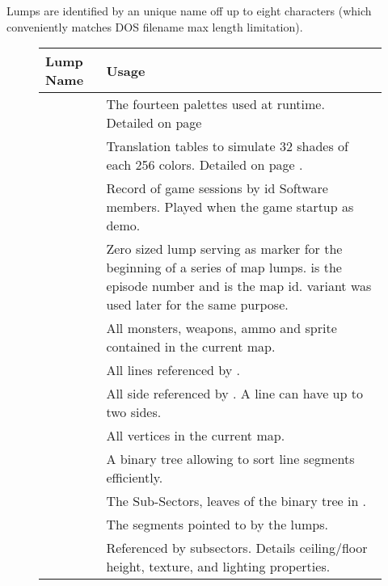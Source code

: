 Lumps are identified by an unique name off up to eight characters (which conveniently matches DOS filename max length limitation).\\
\par
{}
\pagebreak

\begin{figure}[H]
\centering  
\begin{tabularx}{\textwidth}{ L{0.2}  L{0.8}}
  \toprule
  \textbf{Lump Name} &  \textbf{Usage} \\
   
  \toprule 
   & The fourteen palettes used at runtime. Detailed on page \pageref{label_palettes} \\
   & Translation tables to simulate 32 shades of each 256 colors. Detailed on page \pageref{diminishedlightning}. \\
   &  Record of game sessions by id Software members. Played when the game startup as demo.\\
  \toprule
   & Zero sized lump serving as marker for the beginning of a series of map lumps.  is the episode number and  is the map id.  variant was used later for the same purpose.\\
   & All monsters, weapons, ammo and sprite contained in the current map.\\
   & All lines referenced by .\\
   & All side referenced by . A line can have up to two sides.\\
   & All vertices in the current map.\\
   & A binary tree allowing to sort line segments efficiently. \\
   &  The Sub-Sectors, leaves of the binary tree in .  \\
   &  The segments pointed to by the  lumps.\\
   &  Referenced by subsectors. Details ceiling/floor height, texture, and lighting properties.\\
  

\end{tabularx}
\end{figure}
